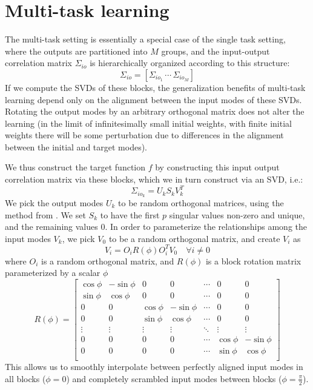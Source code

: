 \documentclass{article}
\begin{document}
\section{Multi-task learning}
The multi-task setting is essentially a special case of the single task setting, where the outputs are partitioned into \(M\) groups, and the input-output correlation matrix \(\Sigma_{io}\) is hierarchically organized according to this structure:
\[\Sigma_{io} = \left[\Sigma_{io_1}\, \cdots\, \Sigma_{io_M}\right]  \]
If we compute the SVDs of these blocks, the generalization benefits of multi-task learning depend only on the alignment between the input modes of these SVDs. Rotating the output modes by an arbitrary orthogonal matrix does not alter the learning (in the limit of infinitesimally small initial weights, with finite initial weights there will be some perturbation due to differences in the alignment between the initial and target modes). \par
We thus construct the target function \(f\) by constructing this input output correlation matrix via these blocks, which we in turn construct via an SVD, i.e.:
\[\Sigma _{io_k} = U_k S_k V_k^T\]
We pick the output modes \(U_k\) to be random orthogonal matrices, using the method from \citet{Mezzadri2006}. We set \(S_k\) to have the first \(p\) singular values non-zero and unique, and the remaining values 0. In order to parameterize the relationships among the input modes \(V_k\), we pick \(V_0\) to be a random orthogonal matrix, and create \(V_i\) as 
\[V_i = O_i R(\phi) O_i^T V_0 \quad \forall i \neq 0\]
where \(O_i\) is a random orthogonal matrix, and \(R(\phi)\) is a block rotation matrix parameterized by a scalar \(\phi\) 
\[R(\phi) = \begin{bmatrix}
\cos \phi & -\sin \phi & 0 & 0 & \cdots & 0 & 0\\
\sin \phi & \cos \phi & 0 & 0 & \cdots & 0 & 0\\
0 & 0 & \cos \phi & -\sin \phi & \cdots & 0 & 0\\
0 & 0 & \sin \phi & \cos \phi & \cdots & 0 & 0\\
\vdots & \vdots &\vdots & \vdots & \ddots & \vdots & \vdots\\
0 & 0 & 0 & 0  & \cdots &\cos \phi & -\sin \phi\\
0 & 0 & 0 & 0  & \cdots & \sin \phi & \cos \phi \\
\end{bmatrix}\]
This allows us to smoothly interpolate between perfectly aligned input modes in all blocks (\(\phi = 0\)) and completely scrambled input modes between blocks (\(\phi = \frac{\pi}{2}\)). \par
\end{document}
